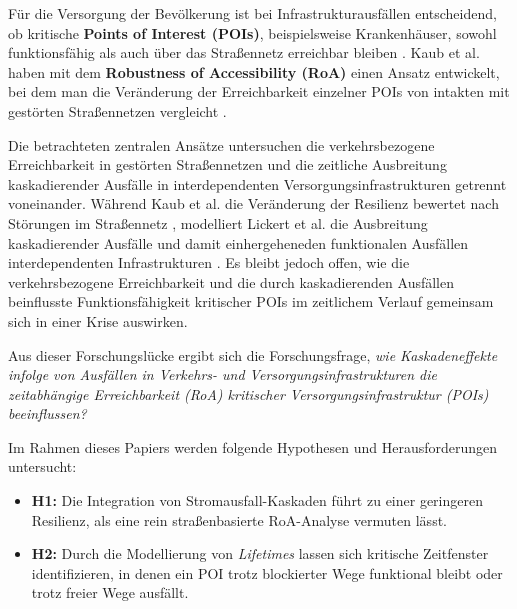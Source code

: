 Für die Versorgung der Bevölkerung ist bei Infrastrukturausfällen entscheidend, ob kritische \textbf{Points of Interest (POIs)}, beispielsweise Krankenhäuser, sowohl funktionsfähig als auch über das Straßennetz erreichbar bleiben \cite{kaub2024,lickert2024}. Kaub et al. haben mit dem \textbf{Robustness of Accessibility (RoA)} einen Ansatz entwickelt, bei dem man die Veränderung der Erreichbarkeit einzelner POIs von intakten mit gestörten Straßennetzen vergleicht \cite{kaub2024}.


Die betrachteten zentralen Ansätze untersuchen die verkehrsbezogene Erreichbarkeit in gestörten Straßennetzen und die zeitliche Ausbreitung kaskadierender Ausfälle in interdependenten Versorgungsinfrastrukturen getrennt voneinander. Während Kaub et al. die Veränderung der Resilienz bewertet nach Störungen im Straßennetz \cite{kaub2024}, modelliert Lickert et al. die Ausbreitung kaskadierender Ausfälle und damit einhergeheneden funktionalen Ausfällen interdependenten Infrastrukturen \cite{lickert2024}. Es bleibt jedoch offen, wie die verkehrsbezogene Erreichbarkeit und die durch kaskadierenden Ausfällen beinflusste Funktionsfähigkeit kritischer POIs im zeitlichem Verlauf gemeinsam sich in einer Krise auswirken.





Aus dieser Forschungslücke ergibt sich die Forschungsfrage, \textit{wie Kaskadeneffekte infolge von Ausfällen in Verkehrs- und Versorgungsinfrastrukturen die zeitabhängige Erreichbarkeit (RoA) kritischer Versorgungsinfrastruktur (POIs) beeinflussen?}





Im Rahmen dieses Papiers werden folgende Hypothesen und Herausforderungen untersucht:
\begin{itemize}
    \item \textbf{H1:} Die Integration von Stromausfall-Kaskaden führt zu einer geringeren Resilienz, als eine rein straßenbasierte RoA-Analyse vermuten lässt.
    \item \textbf{H2:} Durch die Modellierung von \textit{Lifetimes} lassen sich kritische Zeitfenster identifizieren, in denen ein POI trotz blockierter Wege funktional bleibt oder trotz freier Wege ausfällt.
\end{itemize}

